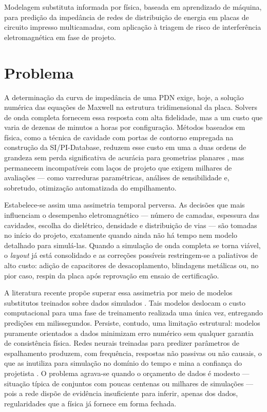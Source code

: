 Modelagem substituta informada por física, baseada em aprendizado de máquina,
para predição da impedância de redes de distribuição de energia em placas de
circuito impresso multicamadas, com aplicação à triagem de risco de
interferência eletromagnética em fase de projeto.

\section{Problema}
\label{sec:problema}

A determinação da curva de impedância de uma PDN exige, hoje, a solução numérica
das equações de Maxwell na estrutura tridimensional da placa. Solvers de onda
completa fornecem essa resposta com alta fidelidade, mas a um custo que varia de
dezenas de minutos a horas por configuração. Métodos baseados em física, como a
técnica de cavidade com portas de contorno empregada na construção da
SI/PI-Database, reduzem esse custo em uma a duas ordens de grandeza sem perda
significativa de acurácia para geometrias planares
\citep{schierholz2021,hillebrecht2024}, mas permanecem incompatíveis com laços de
projeto que exigem milhares de avaliações — como varreduras paramétricas,
análises de sensibilidade e, sobretudo, otimização automatizada do empilhamento.

Estabelece-se assim uma assimetria temporal perversa. As decisões que mais
influenciam o desempenho eletromagnético — número de camadas, espessura das
cavidades, escolha do dielétrico, densidade e distribuição de vias — são tomadas
no início do projeto, exatamente quando ainda não há tempo nem modelo detalhado
para simulá-las. Quando a simulação de onda completa se torna viável, o
\textit{layout} já está consolidado e as correções possíveis restringem-se a
paliativos de alto custo: adição de capacitores de desacoplamento, blindagens
metálicas ou, no pior caso, respin da placa após reprovação em ensaio de
certificação.

A literatura recente propõe superar essa assimetria por meio de modelos
substitutos treinados sobre dados simulados
\citep{zhang2021,swaminathan2020,torun2020}. Tais modelos deslocam o custo
computacional para uma fase de treinamento realizada uma única vez, entregando
predições em milissegundos. Persiste, contudo, uma limitação estrutural: modelos
puramente orientados a dados minimizam erro numérico sem qualquer garantia de
consistência física. Redes neurais treinadas para predizer parâmetros de
espalhamento produzem, com frequência, respostas não passivas ou não causais, o
que as inutiliza para simulação no domínio do tempo e mina a confiança do
projetista \citep{torun2020}. O problema agrava-se quando o orçamento de
dados é modesto — situação típica de conjuntos com poucas centenas ou milhares
de simulações — pois a rede dispõe de evidência insuficiente para inferir, apenas
dos dados, regularidades que a física já fornece em forma fechada.

